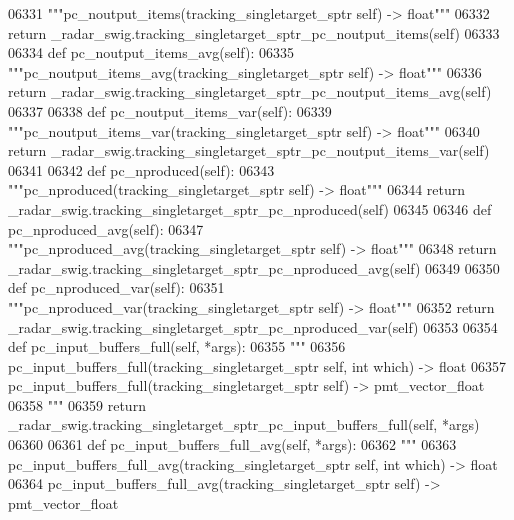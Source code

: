 \begin{DoxyCode}
{{{{{{{{{{{{{{{{{{{{{06331         \textcolor{stringliteral}{"""pc\_noutput\_items(tracking\_singletarget\_sptr self) -> float"""}
06332         \textcolor{keywordflow}{return} \_radar\_swig.tracking\_singletarget\_sptr\_pc\_noutput\_items(self)
06333 
06334     \textcolor{keyword}{def }pc_noutput_items_avg(self):
06335         \textcolor{stringliteral}{"""pc\_noutput\_items\_avg(tracking\_singletarget\_sptr self) -> float"""}
06336         \textcolor{keywordflow}{return} \_radar\_swig.tracking\_singletarget\_sptr\_pc\_noutput\_items\_avg(self)
06337 
06338     \textcolor{keyword}{def }pc_noutput_items_var(self):
06339         \textcolor{stringliteral}{"""pc\_noutput\_items\_var(tracking\_singletarget\_sptr self) -> float"""}
06340         \textcolor{keywordflow}{return} \_radar\_swig.tracking\_singletarget\_sptr\_pc\_noutput\_items\_var(self)
06341 
06342     \textcolor{keyword}{def }pc_nproduced(self):
06343         \textcolor{stringliteral}{"""pc\_nproduced(tracking\_singletarget\_sptr self) -> float"""}
06344         \textcolor{keywordflow}{return} \_radar\_swig.tracking\_singletarget\_sptr\_pc\_nproduced(self)
06345 
06346     \textcolor{keyword}{def }pc_nproduced_avg(self):
06347         \textcolor{stringliteral}{"""pc\_nproduced\_avg(tracking\_singletarget\_sptr self) -> float"""}
06348         \textcolor{keywordflow}{return} \_radar\_swig.tracking\_singletarget\_sptr\_pc\_nproduced\_avg(self)
06349 
06350     \textcolor{keyword}{def }pc_nproduced_var(self):
06351         \textcolor{stringliteral}{"""pc\_nproduced\_var(tracking\_singletarget\_sptr self) -> float"""}
06352         \textcolor{keywordflow}{return} \_radar\_swig.tracking\_singletarget\_sptr\_pc\_nproduced\_var(self)
06353 
06354     \textcolor{keyword}{def }pc_input_buffers_full(self, *args):
06355         \textcolor{stringliteral}{"""}
06356 \textcolor{stringliteral}{        pc\_input\_buffers\_full(tracking\_singletarget\_sptr self, int which) -> float}
06357 \textcolor{stringliteral}{        pc\_input\_buffers\_full(tracking\_singletarget\_sptr self) -> pmt\_vector\_float}
06358 \textcolor{stringliteral}{        """}
06359         \textcolor{keywordflow}{return} \_radar\_swig.tracking\_singletarget\_sptr\_pc\_input\_buffers\_full(self, *args)
06360 
06361     \textcolor{keyword}{def }pc_input_buffers_full_avg(self, *args):
06362         \textcolor{stringliteral}{"""}
06363 \textcolor{stringliteral}{        pc\_input\_buffers\_full\_avg(tracking\_singletarget\_sptr self, int which) -> float}
06364 \textcolor{stringliteral}{        pc\_input\_buffers\_full\_avg(tracking\_singletarget\_sptr self) -> pmt\_vector\_float}
}}}}}}}}}}}}}}}}}}}}}
\end{DoxyCode}
